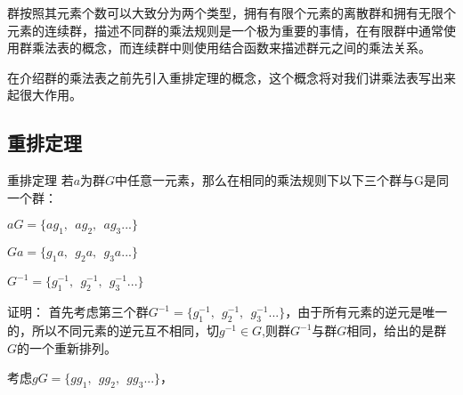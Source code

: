 

群按照其元素个数可以大致分为两个类型，拥有有限个元素的离散群和拥有无限个元素的连续群，描述不同群的乘法规则是一个极为重要的事情，在有限群中通常使用群乘法表的概念，而连续群中则使用结合函数来描述群元之间的乘法关系。

在介绍群的乘法表之前先引入重排定理的概念，这个概念将对我们讲乘法表写出来起很大作用。

\subsection{重排定理}

\begin{theorem}{重排定理}
若$a$为群$G$中任意一元素，那么在相同的乘法规则下以下三个群与G是同一个群：

$aG=\{ag_1,~~ag_2,~~ag_3...\}$

$Ga=\{g_1a,~~g_2a,~~g_3a...\}$

$G^{-1}=\{g_1^{-1},~~g_2^{-1},~~g_3^{-1}...\}$
\end{theorem}

证明：
首先考虑第三个群$G^{-1}=\{g_1^{-1},~~g_2^{-1},~~g_3^{-1}...\}$，由于所有元素的逆元是唯一的，所以不同元素的逆元互不相同，切$g^{-1}\in G$,则群$G^{-1}$与群$G$相同，给出的是群$G$的一个重新排列。

考虑$gG=\{gg_1,~~gg_2,~~gg_3...\}$，
